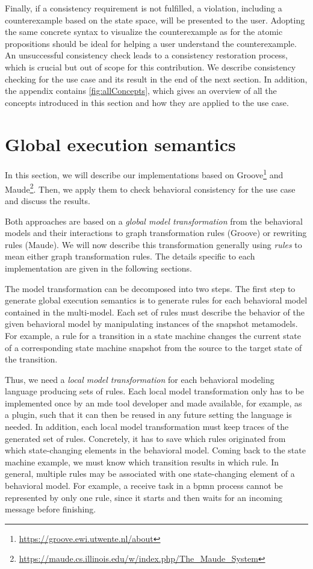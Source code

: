 \documentclass{jot}
\begin{document}
Finally, if a consistency requirement is not fulfilled, a violation, including a counterexample based on the state space, will be presented to the user.
Adopting the same concrete syntax to visualize the counterexample as for the atomic propositions should be ideal for helping a user understand the counterexample. 
An unsuccessful consistency check leads to a consistency restoration process, which is crucial but out of scope for this contribution.
We describe consistency checking for the use case and its result in the end of the next section.
In addition, the appendix contains \autoref{fig:allConcepts}, which gives an overview of all the concepts introduced in this section and how they are applied to the use case.






\section{Global execution semantics} \label{sec:global_execution_semantics}

In this section, we will describe our implementations based on Groove\footnote{\url{https://groove.ewi.utwente.nl/about}} and Maude\footnote{\url{https://maude.cs.illinois.edu/w/index.php/The_Maude_System}}.
Then, we apply them to check behavioral consistency for the use case and discuss the results.

Both approaches are based on a \textit{global model transformation} from the behavioral models and their interactions to graph transformation rules (Groove) or rewriting rules (Maude).
We will now describe this transformation generally using \textit{rules} to mean either graph transformation rules.
The details specific to each implementation are given in the following sections.

The model transformation can be decomposed into two steps.
The first step to generate global execution semantics is to generate rules for each behavioral model contained in the multi-model.
Each set of rules must describe the behavior of the given behavioral model by manipulating instances of the snapshot metamodels.
For example, a rule for a transition in a state machine changes the current state of a corresponding state machine snapshot from the source to the target state of the transition. 

Thus, we need a \emph{local model transformation} for each behavioral modeling language producing sets of rules.
Each local model transformation only has to be implemented once by an \gls*{mde} tool developer and made available, for example, as a plugin, such that it can then be reused in any future setting the language is needed.
In addition, each local model transformation must keep traces of the generated set of rules.
Concretely, it has to save which rules originated from which state-changing elements in the behavioral model.
Coming back to the state machine example, we must know which transition results in which rule.
In general, multiple rules may be associated with one state-changing element of a behavioral model.
For example, a receive task in a \gls*{bpmn} process cannot be represented by only one rule, since it starts and then waits for an incoming message before finishing.
\end{document}
